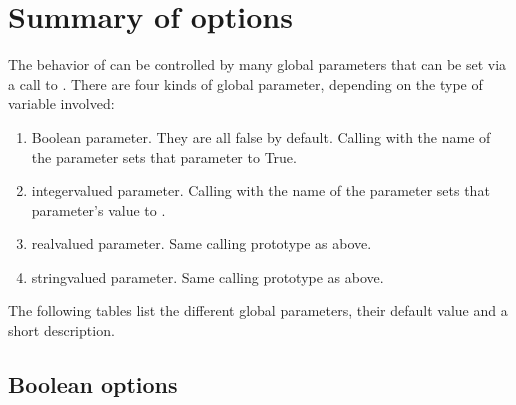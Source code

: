 \documentclass[letterpaper,10pt,english]{sphinxmanual}
\begin{document}
\chapter{Summary of options}
\label{\detokenize{options:summary-of-options}}\label{\detokenize{options::doc}}
\sphinxAtStartPar
The behavior of  can be controlled by many global parameters that can be set via a call to .
There are four kinds of global parameter, depending on the type of variable involved:
\begin{enumerate}
%
\item {} 
\sphinxAtStartPar
Boolean parameter. They are all false by default. Calling  with the name of the parameter sets that parameter to True.

\item {} 
\sphinxAtStartPar
integer\sphinxhyphen{}valued parameter. Calling  with the name of the parameter sets that parameter’s value to .

\item {} 
\sphinxAtStartPar
real\sphinxhyphen{}valued parameter. Same calling prototype as above.

\item {} 
\sphinxAtStartPar
string\sphinxhyphen{}valued parameter. Same calling prototype as above.

\end{enumerate}

\sphinxAtStartPar
The following tables list the different global parameters, their default value and a short description.


\section{Boolean options}
\label{\detokenize{options:boolean-options}}
\end{document}
